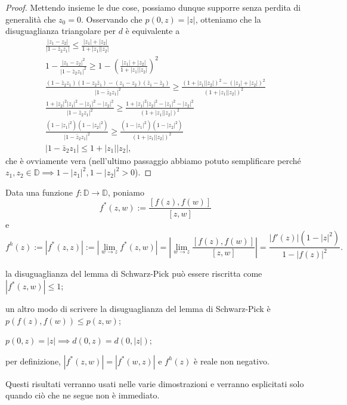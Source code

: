 \begin{proof}
  Mettendo insieme le due cose, possiamo dunque supporre senza perdita di generalità che $z_0=0$. Osservando che $p(0,z)=|z|$, otteniamo che la disuguaglianza triangolare per $d$ è equivalente a
  \begin{gather*}
    \frac{|z_1-z_2|}{|1-\bar{z}_2z_1|} \le \frac{|z_1|+|z_2|}{1+|z_1||z_2|} \\
    1-\frac{|z_1-z_2|^2}{|1-\bar{z}_2z_1|^2} \ge 1-\left(\frac{|z_1|+|z_2|}{1+|z_1||z_2|}\right)^2 \\
    \frac{(1-\bar{z}_2z_1)(1-z_2\bar{z}_1)-(z_1-z_2)(\bar{z}_1-\bar{z}_2)}{|1-\bar{z}_2z_1|^2} \ge \frac{(1+|z_1||z_2|)^2-(|z_1|+|z_2|)^2}{(1+|z_1||z_2|)^2} \\
    \frac{1+|z_2|^2|z_1|^2-|z_1|^2-|z_2|^2}{|1-\bar{z}_2z_1|^2} \ge \frac{1+|z_1|^2|z_2|^2-|z_1|^2-|z_2|^2}{(1+|z_1||z_2|)^2} \\
    \frac{(1-|z_1|^2)(1-|z_2|^2)}{|1-\bar{z}_2z_1|^2} \ge \frac{(1-|z_1|^2)(1-|z_2|^2)}{(1+|z_1||z_2|)^2} \\
    |1-\bar{z}_2z_1| \le 1+|z_1||z_2|,
  \end{gather*}
  che è ovviamente vera (nell'ultimo passaggio abbiamo potuto semplificare perché $z_1, z_2 \in \mathbb{D} \implies 1-|z_1|^2, 1-|z_2|^2>0$).
\end{proof}

\begin{defn}
  Data una funzione $f: \mathbb{D} \longrightarrow \mathbb{D}$, poniamo
  $$f^*(z,w):=\frac{[f(z),f(w)]}{[z,w]}$$
  e
  $$f^h(z):=|f^*(z,z)|:=\left|\lim_{w \longrightarrow z} f^*(z,w)\right|=\left|\lim_{w \longrightarrow z} \frac{[f(z),f(w)]}{[z,w]}\right|=\frac{|f'(z)|(1-|z|^2)}{1-|f(z)|^2}.$$
\end{defn}

\begin{oss}
  \begin{nlist}
    \item la disuguaglianza del lemma di Schwarz-Pick può essere riscritta come $|f^*(z,w)| \le 1$;
    \item  un altro modo di scrivere la disuguaglianza del lemma di Schwarz-Pick è $p(f(z),f(w)) \le p(z,w)$;
    \item $p(0,z)=|z| \implies d(0,z)=d(0,|z|)$;
    \item per definizione, $|f^*(z,w)|=|f^*(w,z)|$ e $f^h(z)$ è reale non negativo.
  \end{nlist}
  Questi risultati verranno usati nelle varie dimostrazioni e verranno esplicitati solo quando ciò che ne segue non è immediato.
\end{oss}

